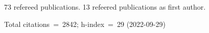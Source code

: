 73 refereed publications. 13 refeered publications as first author.

Total citations~=~2842; h-index~=~29 (2022-09-29)